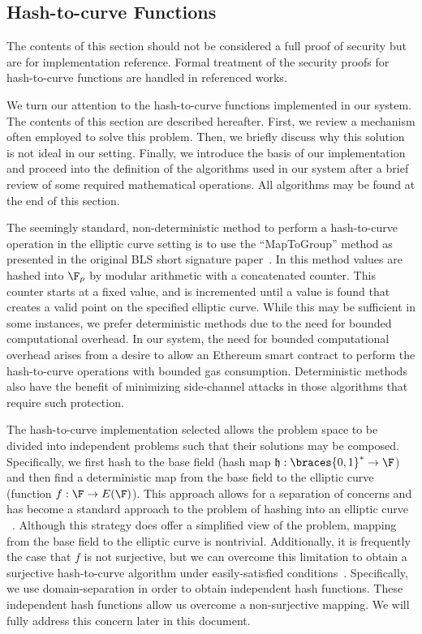 \subsection{Hash-to-curve Functions}
\label{ssec:hash-to-curve}

The contents of this section should not be considered a full proof
of security but are for implementation reference.
Formal treatment of the security proofs for hash-to-curve
functions are handled in referenced works.

We turn our attention to the hash-to-curve functions
implemented in our system.
The contents of this section are described hereafter.
First, we review a mechanism often employed to solve this problem.
Then, we briefly discuss why this solution is not ideal in our setting.
Finally, we introduce the basis of our implementation and proceed into the
definition of the algorithms used in our system after a brief review of
some required mathematical operations.
All algorithms may be found at the end of this section.

The seemingly standard, non-deterministic method to perform a hash-to-curve
operation in the elliptic curve setting is to use the ``MapToGroup''
method as presented in the original BLS short signature
paper~\cite{boneh2001short}.
In this method values are hashed into
$\F_{p}$ by modular arithmetic with a concatenated counter.
This counter starts at a fixed value, and is incremented until
a value is found that creates a valid point on the specified
elliptic curve.
While this may be sufficient in some instances, we prefer 
deterministic methods due to the need for bounded
computational overhead.
In our system, the need for bounded computational
overhead arises from a desire to allow an Ethereum smart contract to
perform the hash-to-curve operations with bounded gas consumption.
Deterministic methods also have the benefit of minimizing
side-channel attacks in those
algorithms that require such protection.

The hash-to-curve implementation selected allows the problem space to be
divided into independent problems such that their solutions may be composed.
Specifically, we first hash to the base field
(hash map $\mathfrak{h}:\braces{0,1}^{*}\to \F$)
and then find a deterministic map from the base field
to the elliptic curve (function $f:\F\to E(\F)$).
This approach allows for a separation of concerns and has become a
standard approach to the problem of hashing into an elliptic curve
~\cite{icart2009hash,ft2012bnhashtocurve,boneh2019h2cBLS12}.
Although this strategy does offer a simplified view of the problem,
mapping from the base field to the elliptic curve is nontrivial.
Additionally, it is frequently the case that $f$ is not surjective, but
we can overcome this limitation to obtain a surjective hash-to-curve algorithm
under easily-satisfied
conditions~\cite{tibouchi2014elligator,ft2012bnhashtocurve}.
Specifically, we use domain-separation in order to obtain independent hash
functions.
These independent hash functions allow us overcome a non-surjective
mapping.
We will fully address this concern later in this document.

